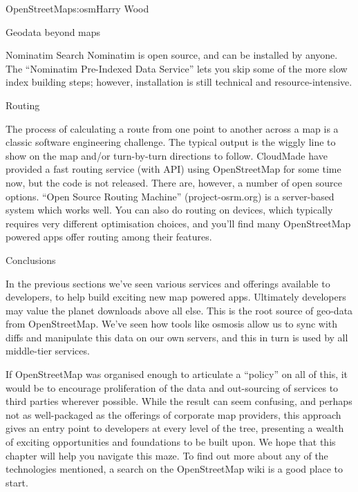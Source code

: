 \begin{aosachapter}{OpenStreetMap}{s:osm}{Harry Wood}
\begin{aosasect1}{Geodata beyond maps}
\begin{aosasect2}{Nominatim Search}
Nominatim is open source, and can be installed by anyone. The
``Nominatim Pre-Indexed Data Service'' lets you skip some of the more
slow index building steps; however, installation is still technical
and resource-intensive.

\end{aosasect2}

\begin{aosasect2}{Routing}

The process of calculating a route from one point to another across a
map is a classic software engineering challenge. The typical output is
the wiggly line to show on the map and/or turn-by-turn directions to
follow. CloudMade have provided a fast routing service (with API)
using OpenStreetMap for some time now, but the code is not
released. There are, however, a number of open source options. ``Open
Source Routing Machine'' (project-osrm.org) is a server-based system
which works well. You can also do routing on devices, which typically
requires very different optimisation choices, and you'll find many
OpenStreetMap powered apps offer routing among their features.

\end{aosasect2}

\end{aosasect1}

\begin{aosasect1}{Conclusions}

In the previous sections we've seen various services and offerings
available to developers, to help build exciting new map powered
apps. Ultimately developers may value the planet downloads above all
else. This is the root source of geo-data from OpenStreetMap. We've
seen how tools like osmosis allow us to sync with diffs and manipulate
this data on our own servers, and this in turn is used by all
middle-tier services.

If OpenStreetMap was organised enough to articulate a ``policy'' on
all of this, it would be to encourage proliferation of the data and
out-sourcing of services to third parties wherever possible. While the
result can seem confusing, and perhaps not as well-packaged as the
offerings of corporate map providers, this approach gives an entry
point to developers at every level of the tree, presenting a wealth of
exciting opportunities and foundations to be built upon. We hope that
this chapter will help you navigate this maze. To find out more about
any of the technologies mentioned, a search on the OpenStreetMap wiki
is a good place to start.


\end{aosasect1}
\end{aosachapter}

